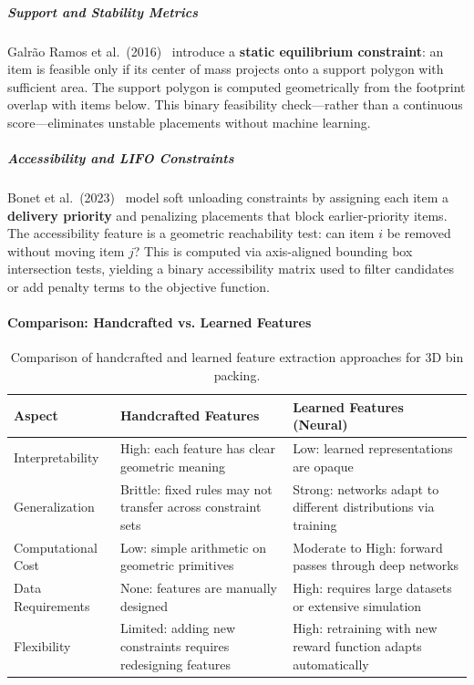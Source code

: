 \subparagraph{Support and Stability Metrics}

Galrão Ramos et al.\ (2016)~\cite{GOGL16} introduce a \textbf{static equilibrium constraint}: an item is feasible only if its center of mass projects onto a support polygon with sufficient area. The support polygon is computed geometrically from the footprint overlap with items below. This binary feasibility check---rather than a continuous score---eliminates unstable placements without machine learning.

\subparagraph{Accessibility and LIFO Constraints}

Bonet et al.\ (2023)~\cite{BTC23} model soft unloading constraints by assigning each item a \textbf{delivery priority} and penalizing placements that block earlier-priority items. The accessibility feature is a geometric reachability test: can item $i$ be removed without moving item $j$? This is computed via axis-aligned bounding box intersection tests, yielding a binary accessibility matrix used to filter candidates or add penalty terms to the objective function.


\paragraph{Comparison: Handcrafted vs. Learned Features}

\begin{table}[h]
\centering
\small
\begin{tabular}{p{3cm}p{5.5cm}p{5.5cm}}
\hline
\textbf{Aspect} & \textbf{Handcrafted Features} & \textbf{Learned Features (Neural)} \\
\hline
Interpretability & High: each feature has clear geometric meaning & Low: learned representations are opaque \\
\hline
Generalization & Brittle: fixed rules may not transfer across constraint sets & Strong: networks adapt to different distributions via training \\
\hline
Computational Cost & Low: simple arithmetic on geometric primitives & Moderate to High: forward passes through deep networks \\
\hline
Data Requirements & None: features are manually designed & High: requires large datasets or extensive simulation \\
\hline
Flexibility & Limited: adding new constraints requires redesigning features & High: retraining with new reward function adapts automatically \\
\hline
\end{tabular}
\caption{Comparison of handcrafted and learned feature extraction approaches for 3D bin packing.}
\label{tab:features-comparison}
\end{table}


